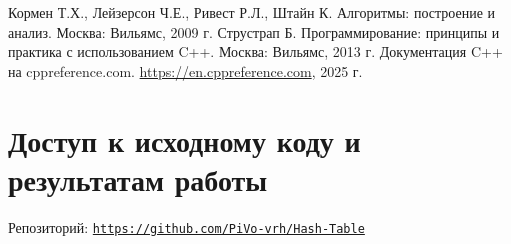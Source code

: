 \documentclass[12pt,a4paper]{scrartcl}
\begin{document}
\begin{thebibliography}{9}
Кормен Т.Х., Лейзерсон Ч.Е., Ривест Р.Л., Штайн К. Алгоритмы: построение и анализ. Москва: Вильямс, 2009 г.
Струстрап Б. Программирование: принципы и практика с использованием C++. Москва: Вильямс, 2013 г.
Документация C++ на cppreference.com. \url{https://en.cppreference.com}, 2025 г.
\end{thebibliography}

\section{Доступ к исходному коду и результатам работы}
\item Репозиторий: \texttt{\url{https://github.com/PiVo-vrh/Hash-Table}}
\end{document}
